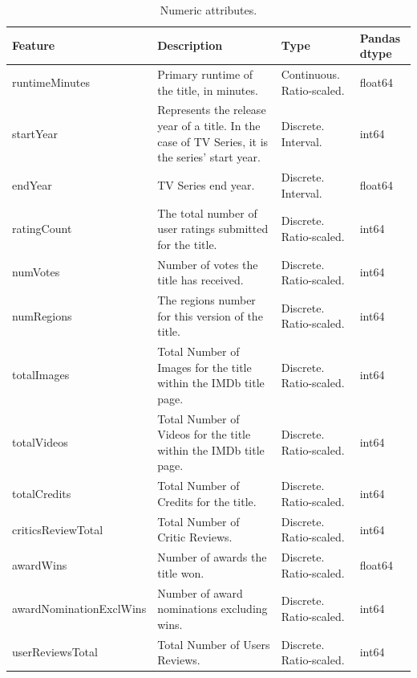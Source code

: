 \begin{table}[h]
    \centering
    \renewcommand{\arraystretch}{1.2}
    \scriptsize
    \begin{tabular}{|p{3cm}|p{5cm}|p{1.5cm}|p{1.5cm}|}
    \hline
    \textbf{Feature} & \textbf{Description} & \textbf{Type} & \textbf{Pandas dtype} \\ \hline
    runtimeMinutes & Primary runtime of the title, in minutes. & Continuous. Ratio-scaled. & float64 \\ \hline
    startYear & Represents the release year of a title. In the case of TV Series, it is the series' start year. & Discrete. Interval. & int64 \\ \hline
    endYear & TV Series end year. & Discrete. Interval. & float64 \\ \hline
    ratingCount & The total number of user ratings submitted for the title. & Discrete. Ratio-scaled. & int64 \\ \hline
    numVotes & Number of votes the title has received. & Discrete. Ratio-scaled. & int64 \\ \hline
    numRegions & The regions number for this version of the title. & Discrete. Ratio-scaled. & int64 \\ \hline
    totalImages & Total Number of Images for the title within the IMDb title page. & Discrete. Ratio-scaled. & int64 \\ \hline
    totalVideos & Total Number of Videos for the title within the IMDb title page. & Discrete. Ratio-scaled. & int64 \\ \hline
    totalCredits & Total Number of Credits for the title. & Discrete. Ratio-scaled. & int64 \\ \hline
    criticsReviewTotal & Total Number of Critic Reviews. & Discrete. Ratio-scaled. & int64 \\ \hline
    awardWins & Number of awards the title won. & Discrete. Ratio-scaled. & float64 \\ \hline
    awardNominationExclWins & Number of award nominations excluding wins. & Discrete. Ratio-scaled. & int64 \\ \hline
    userReviewsTotal & Total Number of Users Reviews. & Discrete. Ratio-scaled. & int64 \\ \hline
    \end{tabular}
    \caption{Numeric attributes.}
    \label{tab:original_vars_num}
\end{table}


